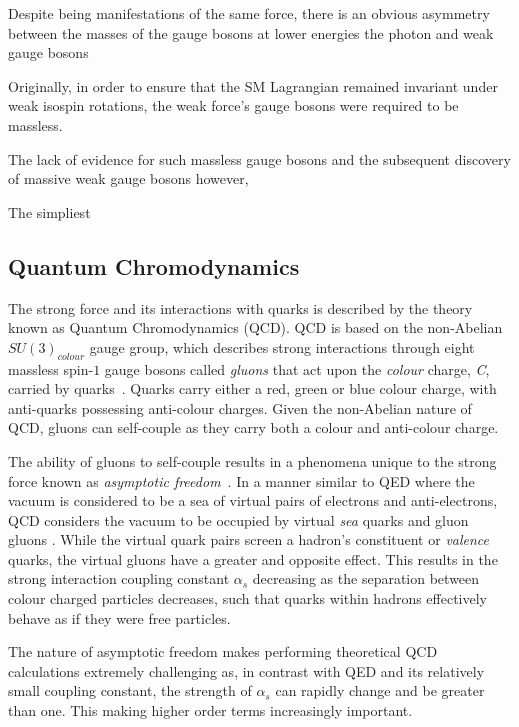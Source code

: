 
Despite being manifestations of the same force, there is an obvious asymmetry between the masses of the gauge bosons 
 at lower energies the photon and weak gauge bosons

Originally, in order to ensure that the SM Lagrangian remained invariant under weak isospin rotations, the weak force's gauge bosons were required to be massless.

The lack of evidence for such massless gauge bosons and the subsequent discovery of massive weak gauge bosons however, 

The simpliest 

\subsection{Quantum Chromodynamics}\label{subsec:QCD}
The strong force and its interactions with quarks is described by the theory known as Quantum Chromodynamics (QCD).
QCD is based on the non-Abelian $SU(3)_{colour}$ gauge group, which describes strong interactions through eight massless spin-$1$ gauge bosons called \emph{gluons} that act upon the \emph{colour} charge, \emph{C}, carried by quarks~\cite{ElectroweakStrong}.
Quarks carry either a red, green or blue colour charge, with anti-quarks possessing anti-colour charges.
Given the non-Abelian nature of QCD, gluons can self-couple as they carry both a colour and anti-colour charge.

The ability of gluons to self-couple results in a phenomena unique to the strong force known as \emph{asymptotic freedom}~\cite{ElectroweakStrong,coughlan2006ideas,devenish2004deep}.
In a manner similar to QED where the vacuum is considered to be a sea of virtual pairs of electrons and anti-electrons, QCD considers the vacuum to be occupied by virtual \emph{sea} quarks and gluon gluons .
While the virtual quark pairs screen a hadron's constituent or \emph{valence} quarks, the virtual gluons have a greater and opposite effect. 
This results in the strong interaction coupling constant $\alpha_{s}$ decreasing as the separation between colour charged particles decreases, such that quarks within hadrons effectively behave as if they were free particles.

The nature of asymptotic freedom makes performing theoretical QCD calculations extremely challenging as, in contrast with QED and its relatively small coupling constant, the strength of $\alpha_{s}$ can rapidly change and be greater than one.
This making higher order terms increasingly important.


